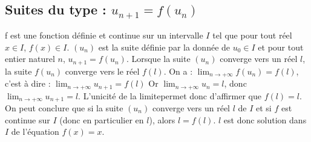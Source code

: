 \documentclass[11pt,a4paper]{article}
\begin{document}
\subsection{Suites du type : $u_{n+1} = f(u_n)$}

\begin{flushleft}
    f est une fonction définie et continue sur un intervalle $I$ tel que pour tout réel $x \in I$, $f(x) \in I$.
    \newline
    $(u_n)$ est la suite définie par la donnée de $u_0 \in I$ et pour tout entier naturel $n$, $u_{n+1} = f(u_n)$.
    \newline
    Lorsque la suite $(u_n)$ converge vers un réel $l$, la suite $f(u_n)$ converge vers le réel $f(l)$.
    \newline
    On a : $\displaystyle \lim_{n \to +\infty} f(u_n) = f(l)$, c'est à dire : $\displaystyle \lim_{n \to +\infty} u_{n+1} = f(l)$
    \newline
    Or $\displaystyle \lim_{n \to +\infty} u_{n} = l$, donc $\displaystyle \lim_{n \to +\infty} u_{n+1} = l$.
    \newline
    L'unicité de la limitepermet donc d'affirmer que $f(l) = l$.
    \newline
    On peut conclure que si la suite $(u_n)$ converge vers un réel $l$ de $I$ et si $f$ est continue sur $I$ (donc en particulier en $l$), alors $l = f(l)$.
    \newline
    $l$ est donc solution dans $I$ de l'équation $f(x) = x$.
\end{flushleft}
\end{document}
